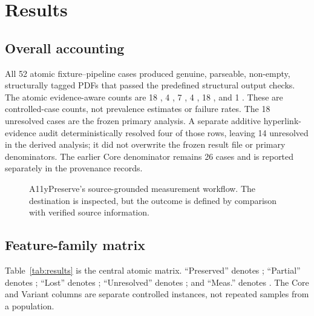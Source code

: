 \section{Results}
\label{sec:results}

\subsection{Overall accounting}

All 52 atomic fixture--pipeline cases produced genuine, parseable, non-empty, structurally tagged PDFs that passed the predefined structural output checks. The atomic evidence-aware counts are 18 \verifiedpreserved{}, 4 \observedpartial{}, 7 \altered{}, 4 \confirmedlost{}, 18 \unresolved{}, and 1 \measured{}. These are controlled-case counts, not prevalence estimates or failure rates. The 18 unresolved cases are the frozen primary analysis. A separate additive hyperlink-evidence audit deterministically resolved four of those rows, leaving 14 unresolved in the derived analysis; it did not overwrite the frozen result file or primary denominators. The earlier Core denominator remains 26 cases and is reported separately in the provenance records.

\begin{figure}[t]
\centering
{}
\caption{A11yPreserve's source-grounded measurement workflow. The destination is inspected, but the outcome is defined by comparison with verified source information.}
\label{fig:workflow}
\end{figure}

\subsection{Feature-family matrix}

Table~\ref{tab:results} is the central atomic matrix. ``Preserved'' denotes \verifiedpreserved{}; ``Partial'' denotes \observedpartial{}; ``Lost'' denotes \confirmedlost{}; ``Unresolved'' denotes \unresolved{}; and ``Meas.'' denotes \measured{}. The Core and Variant columns are separate controlled instances, not repeated samples from a population.

